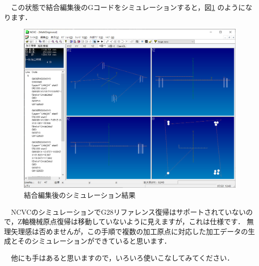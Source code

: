 　この状態で結合編集後のGコードをシミュレーションすると，図\ref{fig:simu1} のようになります．

\begin{figure}[H]
\centering
\includegraphics[scale=0.5]{No4/fig/simu1.png}
\caption{結合編集後のシミュレーション結果}
\label{fig:simu1}
\end{figure}

　NCVCのシミュレーションでG28リファレンス復帰はサポートされていないので，Z軸機械原点復帰は移動していないように見えますが，これは仕様です．
無理矢理感は否めませんが，この手順で複数の加工原点に対応した加工データの生成とそのシミュレーションができていると思います．

　他にも手はあると思いますので，いろいろ使いこなしてみてください．

